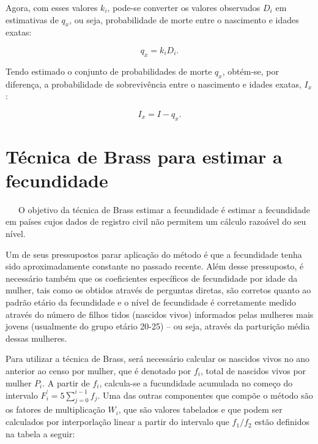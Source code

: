 \documentclass[
  12pt,
  a4paper,
]{scrreprt}
\begin{document}
Agora, com esses valores \(k_i\), pode-se converter os valores
observados \(D_i\) em estimativas de \(q_x\), ou seja, probabilidade de
morte entre o nascimento e idades exatas:

\[
q_x = k_i D_i\text{.}
\]

Tendo estimado o conjunto de probabilidades de morte \(q_x\), obtém-se,
por diferença, a probabilidade de sobrevivência entre o nascimento e
idades exatas, \(I_x\):

\[
I_x = I - q_x\text{.}
\]

\section{Técnica de Brass para estimar a
fecundidade}\label{tuxe9cnica-de-brass-para-estimar-a-fecundidade}

~~~O objetivo da técnica de Brass estimar a fecundidade é estimar a
fecundidade em países cujos dados de registro civil não permitem um
cálculo razoável do seu nível.

\vspace{12pt}

Um de seus pressupostos parar aplicação do método é que a fecundidade
tenha sido aproximadamente constante no passado recente. Além desse
pressuposto, é necessário também que os coeficientes específicos de
fecundidade por idade da mulher, tais como os obtidos através de
perguntas diretas, são corretos quanto ao padrão etário da fecundidade e
o nível de fecundidade é corretamente medido através do número de filhos
tidos (nascidos vivos) informados pelas mulheres mais jovens (usualmente
do grupo etário 20-25) -- ou seja, através da parturição média dessas
mulheres.

\vspace{12pt}

Para utilizar a técnica de Brass, será necessário calcular os nascidos
vivos no ano anterior ao censo por mulher, que é denotado por \(f_i\),
total de nascidos vivos por mulher \(P_i\). A partir de \(f_i\),
calcula-se a fucundidade acumulada no começo do intervalo
\(F^{'}_i = 5 \sum_{j=0}^{i-1} f_{j}\). Uma das outras componentes que
compõe o método são os fatores de multiplicação \(W_i\), que são valores
tabelados e que podem ser calculados por interporlação linear a partir
do intervalo que \(f_{1}/f_{2}\) estão definidos na tabela a seguir:
\end{document}
